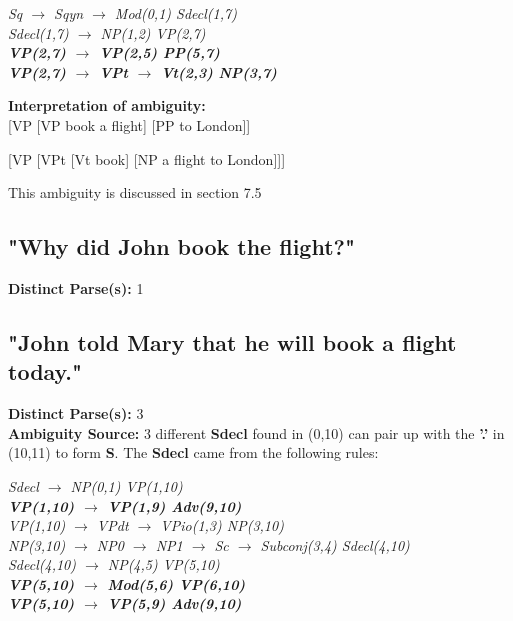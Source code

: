 \documentclass{article}
\begin{document}
\begin{center}
	\emph{Sq $\rightarrow$ Sqyn $\rightarrow$ Mod(0,1) Sdecl(1,7)}\\
	\emph{Sdecl(1,7) $\rightarrow$ NP(1,2) VP(2,7)}\\
	\textbf{\emph{VP(2,7) $\rightarrow$ VP(2,5) PP(5,7)}\\
	\emph{VP(2,7) $\rightarrow$ VPt $\rightarrow$ Vt(2,3) NP(3,7)}}
\end{center}

\textbf{Interpretation of ambiguity:}\\
{[}VP {[}VP book a flight{]} {[}PP to London{]}{]}

{[}VP {[}VPt {[}Vt book{]} {[}NP a flight to London{]}{]}{]}

This ambiguity is discussed in section 7.5


\subsection{"Why did John book the flight?"}

\textbf{Distinct Parse(s):} 1

\subsection{"John told Mary that he will book a flight today."}

\textbf{Distinct Parse(s):} 3\\

\textbf{Ambiguity Source:} 3 different \textbf{Sdecl} found in (0,10) can pair up with the \textbf{'.'} in (10,11) to form \textbf{S}. The \textbf{Sdecl} came from the following rules:

\begin{center}
	\emph{Sdecl $\rightarrow$ NP(0,1) VP(1,10)}\\
	\textbf{\emph{VP(1,10) $\rightarrow$ VP(1,9) Adv(9,10)}}\\
	\emph{VP(1,10) $\rightarrow$ VPdt $\rightarrow$ VPio(1,3) NP(3,10)}\\
	
	\emph{NP(3,10) $\rightarrow$ NP0 $\rightarrow$ NP1 $\rightarrow$ Sc $\rightarrow$ Subconj(3,4) Sdecl(4,10)}\\
	\emph{Sdecl(4,10) $\rightarrow$ NP(4,5) VP(5,10)}\\
	\textbf{\emph{VP(5,10) $\rightarrow$ Mod(5,6) VP(6,10)}\\
	\emph{VP(5,10) $\rightarrow$ VP(5,9) Adv(9,10)}}
\end{center}
\end{document}
